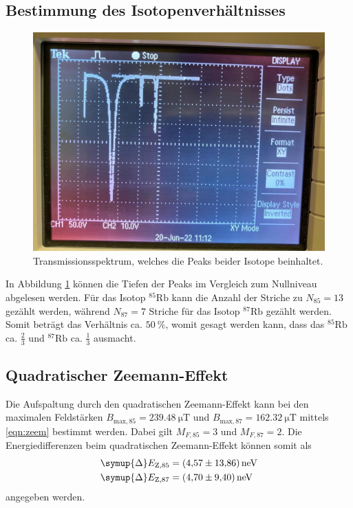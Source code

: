 \subsection{Bestimmung des Isotopenverhältnisses}
\begin{figure}
    \centering
    \caption{Transmissionsspektrum, welches die Peaks beider Isotope beinhaltet.}
    \label{fig:transmissionsspektrum}
    \includegraphics[width = 0.7 \textwidth]{data_scripts/index.jpg}
\end{figure}
In Abbildung \ref{fig:transmissionsspektrum} können die Tiefen der Peaks im Vergleich zum Nullniveau abgelesen werden.
Für das Isotop $^{85}\text{Rb}$ kann die Anzahl der Striche zu $N_{85}=13$ gezählt werden, während 
$N_{87} = 7$ Striche für das Isotop $^{87}\text{Rb}$ gezählt werden.
Somit beträgt das Verhältnis ca. $\qty{50}{\percent}$, womit gesagt werden kann, dass 
das $^{85}\text{Rb}$ ca. $\frac{2}{3}$ und $^{87}\text{Rb}$ ca. $\frac{1}{3}$ ausmacht.
\subsection{Quadratischer Zeemann-Effekt}
Die Aufspaltung durch den quadratischen Zeemann-Effekt kann bei den maximalen Feldstärken 
$B_{\text{max},85} = \qty{239.48}{\micro\tesla}$ und $B_{\text{max},87} = \qty{162.32}{\micro\tesla}$ mittels \eqref{eqn:zeem} bestimmt werden.
Dabei gilt $M_{F, 85} = 3$ und $M_{F, 87} = 2$.
Die Energiedifferenzen beim quadratischen Zeemann-Effekt können somit als
\begin{align*}
    \symup{\Delta}E_{\text{Z}, 85} &= \qty{4.57(1386)}{\nano\electronvolt} \\
    \symup{\Delta}E_{\text{Z}, 87} &= \qty{4.70(940)}{\nano\electronvolt} 
\end{align*} 
angegeben werden.
